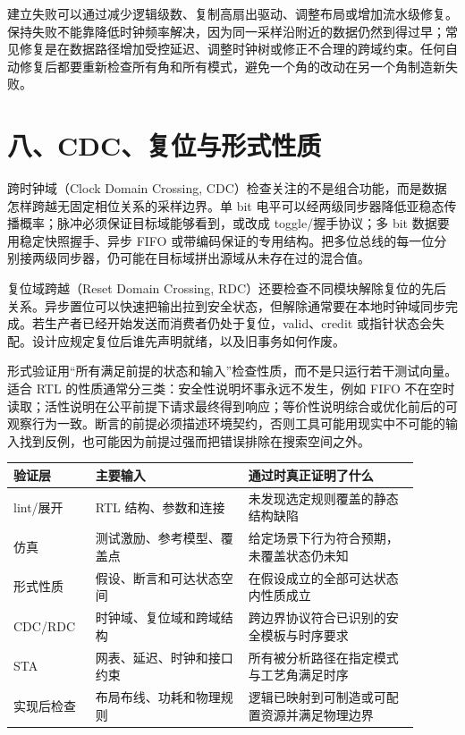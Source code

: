 建立失败可以通过减少逻辑级数、复制高扇出驱动、调整布局或增加流水级修复。保持失败不能靠降低时钟频率解决，因为同一采样沿附近的数据仍然到得过早；常见修复是在数据路径增加受控延迟、调整时钟树或修正不合理的跨域约束。任何自动修复后都要重新检查所有角和所有模式，避免一个角的改动在另一个角制造新失败。

\section{八、CDC、复位与形式性质}

跨时钟域（Clock Domain Crossing, CDC）检查关注的不是组合功能，而是数据怎样跨越无固定相位关系的采样边界。单 bit 电平可以经两级同步器降低亚稳态传播概率；脉冲必须保证目标域能够看到，或改成 toggle/握手协议；多 bit 数据要用稳定快照握手、异步 FIFO 或带编码保证的专用结构。把多位总线的每一位分别接两级同步器，仍可能在目标域拼出源域从未存在过的混合值。

复位域跨越（Reset Domain Crossing, RDC）还要检查不同模块解除复位的先后关系。异步置位可以快速把输出拉到安全状态，但解除通常要在本地时钟域同步完成。若生产者已经开始发送而消费者仍处于复位，valid、credit 或指针状态会失配。设计应规定复位后谁先声明就绪，以及旧事务如何作废。

形式验证用“所有满足前提的状态和输入”检查性质，而不是只运行若干测试向量。适合 RTL 的性质通常分三类：安全性说明坏事永远不发生，例如 FIFO 不在空时读取；活性说明在公平前提下请求最终得到响应；等价性说明综合或优化前后的可观察行为一致。断言的前提必须描述环境契约，否则工具可能用现实中不可能的输入找到反例，也可能因为前提过强而把错误排除在搜索空间之外。

\begin{longtable}{L{0.18\linewidth}L{0.34\linewidth}L{0.38\linewidth}}
\toprule
验证层 & 主要输入 & 通过时真正证明了什么 \\
\midrule
lint/展开 & RTL 结构、参数和连接 & 未发现选定规则覆盖的静态结构缺陷 \\\tablerowrule
仿真 & 测试激励、参考模型、覆盖点 & 给定场景下行为符合预期，未覆盖状态仍未知 \\\tablerowrule
形式性质 & 假设、断言和可达状态空间 & 在假设成立的全部可达状态内性质成立 \\\tablerowrule
CDC/RDC & 时钟域、复位域和跨域结构 & 跨边界协议符合已识别的安全模板与时序要求 \\\tablerowrule
STA & 网表、延迟、时钟和接口约束 & 所有被分析路径在指定模式与工艺角满足时序 \\\tablerowrule
实现后检查 & 布局布线、功耗和物理规则 & 逻辑已映射到可制造或可配置资源并满足物理边界 \\
\bottomrule
\end{longtable}

